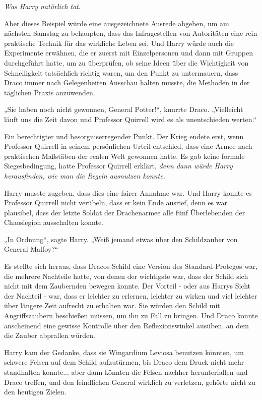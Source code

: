 {\emph{Was Harry natürlich tat}.

Aber dieses Beispiel würde eine ausgezeichnete Ausrede abgeben, um am nächsten Samstag zu behaupten, dass das Infragestellen von Autoritäten eine rein praktische Technik für das wirkliche Leben sei. Und Harry würde auch die Experimente erwähnen, die er zuerst mit Einzelpersonen und dann mit Gruppen durchgeführt hatte, um zu überprüfen, ob seine Ideen über die Wichtigkeit von Schnelligkeit tatsächlich richtig waren, um den Punkt zu untermauern, dass Draco immer nach Gelegenheiten Ausschau halten musste, die Methoden in der täglichen Praxis anzuwenden.

„Sie haben noch nicht gewonnen, General Potter!“, knurrte Draco. „Vielleicht läuft uns die Zeit davon und Professor Quirrell wird es als unentschieden werten.“

Ein berechtigter und besorgniserregender Punkt. Der Krieg endete erst, wenn Professor Quirrell in seinem persönlichen Urteil entschied, dass eine Armee nach praktischen Maßstäben der realen Welt gewonnen hatte. Es gab keine formale Siegesbedingung, hatte Professor Quirrell erklärt, \emph{denn dann würde Harry herausfinden, wie man die Regeln ausnutzen konnte.}

Harry musste zugeben, dass dies eine fairer Annahme war. Und Harry konnte es Professor Quirrell nicht verübeln, dass er kein Ende ausrief, denn es war plausibel, dass der letzte Soldat der Drachenarmee alle fünf Überlebenden der Chaoslegion ausschalten konnte.

„In Ordnung“, sagte Harry. „Weiß jemand etwas über den Schildzauber von General Malfoy?“

Es stellte sich heraus, dass Dracos Schild eine Version des Standard-Protegos war, die mehrere Nachteile hatte, von denen der wichtigste war, dass der Schild sich nicht mit dem Zaubernden bewegen konnte. Der Vorteil - oder aus Harrys Sicht der Nachteil - war, dass er leichter zu erlernen, leichter zu wirken und viel leichter über längere Zeit aufrecht zu erhalten war. Sie würden den Schild mit Angriffszaubern beschießen müssen, um ihn zu Fall zu bringen. Und Draco konnte anscheinend eine gewisse Kontrolle über den Reflexionswinkel ausüben, an dem die Zauber abprallen würden.

Harry kam der Gedanke, dass sie Wingardium Leviosa benutzen könnten, um schwere Felsen auf dem Schild aufzutürmen, bis Draco dem Druck nicht mehr standhalten konnte... aber dann könnten die Felsen nachher herunterfallen und Draco treffen, und den feindlichen General wirklich zu verletzen, gehörte nicht zu den heutigen Zielen.

}
